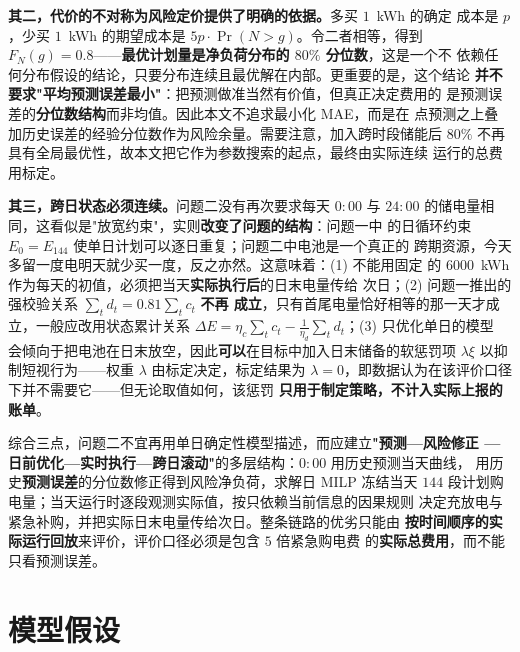 \documentclass[withoutpreface,bwprint]{cumcmthesis}
\begin{document}
\textbf{其二，代价的不对称为风险定价提供了明确的依据。}多买 $1$~kWh 的确定
成本是 $p$，少买 $1$~kWh 的期望成本是 $5p\cdot\Pr(N>g)$。令二者相等，得到
$F_N(g)=0.8$——\textbf{最优计划量是净负荷分布的 $80\%$ 分位数}，这是一个不
依赖任何分布假设的结论，只要分布连续且最优解在内部。更重要的是，这个结论
\textbf{并不要求"平均预测误差最小"}：把预测做准当然有价值，但真正决定费用的
是预测误差的\textbf{分位数结构}而非均值。因此本文不追求最小化 MAE，而是在
点预测之上叠加历史误差的经验分位数作为风险余量。需要注意，加入跨时段储能后
$80\%$ 不再具有全局最优性，故本文把它作为参数搜索的起点，最终由实际连续
运行的总费用标定。

\textbf{其三，跨日状态必须连续。}问题二没有再次要求每天 $0{:}00$ 与 $24{:}00$
的储电量相同，这看似是"放宽约束"，实则\textbf{改变了问题的结构}：问题一中
的日循环约束 $E_0=E_{144}$ 使单日计划可以逐日重复；问题二中电池是一个真正的
跨期资源，今天多留一度电明天就少买一度，反之亦然。这意味着：(1) 不能用固定
的 $6000$~kWh 作为每天的初值，必须把当天\textbf{实际执行后}的日末电量传给
次日；(2) 问题一推出的强校验关系 $\sum_t d_t=0.81\sum_t c_t$ \textbf{不再
成立}，只有首尾电量恰好相等的那一天才成立，一般应改用状态累计关系
$\Delta E=\eta_c\sum_t c_t-\frac{1}{\eta_d}\sum_t d_t$；(3) 只优化单日的模型
会倾向于把电池在日末放空，因此\textbf{可以}在目标中加入日末储备的软惩罚项
$\lambda\xi$ 以抑制短视行为——权重 $\lambda$ 由标定决定，标定结果为
$\lambda=0$，即数据认为在该评价口径下并不需要它——但无论取值如何，该惩罚
\textbf{只用于制定策略，不计入实际上报的账单}。

综合三点，问题二不宜再用单日确定性模型描述，而应建立\textbf{"预测—风险修正
—日前优化—实时执行—跨日滚动"}的多层结构：$0{:}00$ 用历史预测当天曲线，
用历史\textbf{预测误差}的分位数修正得到风险净负荷，求解日 MILP 冻结当天
$144$ 段计划购电量；当天运行时逐段观测实际值，按只依赖当前信息的因果规则
决定充放电与紧急补购，并把实际日末电量传给次日。整条链路的优劣只能由
\textbf{按时间顺序的实际运行回放}来评价，评价口径必须是包含 $5$ 倍紧急购电费
的\textbf{实际总费用}，而不能只看预测误差。

\section{模型假设}
\end{document}
